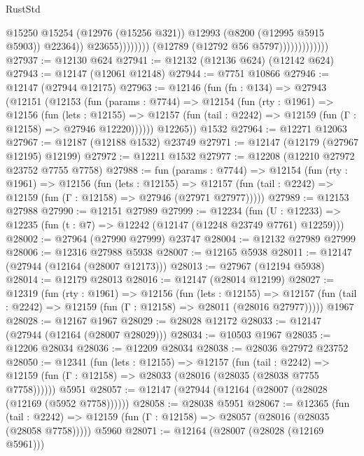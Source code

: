 \begin{lexlean}{RustStd}
\begin{coremodule}
                                              @15250
                                              @15254
                                              (@12976 (@15256 @321))
                                              @12993
                                              (@8200 (@12995 @5915 @5903))
                                              @22364))
                                          @23655))))))))
                          (@12789 (@12792 @56 @5797)))))))))))))
@27937 := @12130 @624
@27941 := @12132 (@12136 @624) (@12142 @624)
@27943 := @12147 (@12061 @12148)
@27944 := @7751 @10866
@27946 := @12147 (@27944 @12175)
@27963 := @12146
    (fun (fn : @134) =>
    @27943
      (@12151
        (@12153
          (fun (params : @7744) =>
          @12154
            (fun (rty : @1961) =>
            @12156
              (fun (lets : @12155) =>
              @12157 (fun (tail : @2242) => @12159 (fun (Γ : @12158) => @27946 @12220))))))
        @12265))
    @1532
@27964 := @12271 @12063
@27967 := @12187 (@12188 @1532) @23749
@27971 := @12147 (@12179 (@27967 @12195) @12199)
@27972 := @12211 @1532
@27977 := @12208 (@12210 @27972 @23752 @7755 @7758)
@27988 := fun (params : @7744) =>
  @12154
    (fun (rty : @1961) =>
    @12156
      (fun (lets : @12155) =>
      @12157 (fun (tail : @2242) => @12159 (fun (Γ : @12158) => @27946 (@27971 @27977)))))
@27989 := @12153 @27988
@27990 := @12151 @27989
@27999 := @12234
    (fun (U : @12233) => @12235 (fun (t : @7) => @12242 (@12147 (@12248 @23749 @7761) @12259)))
@28002 := @27964 (@27990 @27999) @23747
@28004 := @12132 @27989 @27999
@28006 := @12316 @27988 @5938
@28007 := @12165 @5938
@28011 := @12147 (@27944 (@12164 (@28007 @12173)))
@28013 := @27967 (@12194 @5938)
@28014 := @12179 @28013
@28016 := @12147 (@28014 @12199)
@28027 := @12319
    (fun (rty : @1961) =>
    @12156
      (fun (lets : @12155) =>
      @12157 (fun (tail : @2242) => @12159 (fun (Γ : @12158) => @28011 (@28016 @27977)))))
    @1967
@28028 := @12167 @1967
@28029 := @28028 @12172
@28033 := @12147 (@27944 (@12164 (@28007 @28029)))
@28034 := @10503 @1967
@28035 := @12206 @28034
@28036 := @12209 @28034
@28038 := @28036 @27972 @23752
@28050 := @12341
    (fun (lets : @12155) =>
    @12157
      (fun (tail : @2242) =>
      @12159 (fun (Γ : @12158) => @28033 (@28016 (@28035 (@28038 @7755 @7758))))))
    @5951
@28057 := @12147 (@27944 (@12164 (@28007 (@28028 (@12169 (@5952 @7758))))))
@28058 := @28038 @5951
@28067 := @12365
    (fun (tail : @2242) => @12159 (fun (Γ : @12158) => @28057 (@28016 (@28035 (@28058 @7758)))))
    @5960
@28071 := @12164 (@28007 (@28028 (@12169 @5961)))

\end{coremodule}
\end{lexlean}

